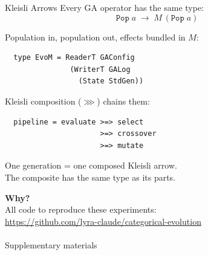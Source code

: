 \documentclass[aspectratio=169]{beamer}
\begin{document}
\begin{frame}[fragile]{Kleisli Arrows}
  Every GA operator has the same type:
  \[
    \texttt{Pop}\;a \;\longrightarrow\; M\,(\texttt{Pop}\;a)
  \]

  \vspace{4pt}
  {\normalsize Population in, population out, effects bundled in $M$:}

  \vspace{6pt}
  \begin{verbatim}
  type EvoM = ReaderT GAConfig
               (WriterT GALog
                 (State StdGen))
  \end{verbatim}

  \vspace{4pt}
  {\normalsize Kleisli composition ($\ggg$) chains them:}

  \vspace{4pt}
  \begin{verbatim}
  pipeline = evaluate >=> select
                      >=> crossover
                      >=> mutate
  \end{verbatim}

  \vspace{4pt}
  {\normalsize One generation = one composed Kleisli arrow.\\
  The composite has the \alert{same type} as its parts.}
\end{frame}

\begin{frame}{}
  \vfill
  \begin{center}
    {\Huge\bfseries\color{geccoHighlight} Why?}\\[24pt]
    {\small\color{gray!70} All code to reproduce these experiments:\\[4pt]
      \url{https://github.com/lyra-claude/categorical-evolution}}\\[16pt]
    {}\\[4pt]
    {\scriptsize\color{gray!70} Supplementary materials}
  \end{center}
  \vfill
\end{frame}
\end{document}

